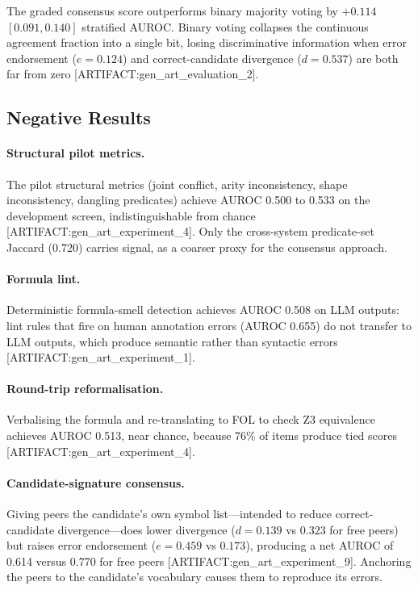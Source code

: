 \documentclass[11pt,letterpaper]{article}
\begin{document}
The graded consensus score outperforms binary majority voting by $+0.114$ $[0.091, 0.140]$ stratified AUROC.
Binary voting collapses the continuous agreement fraction into a single bit, losing discriminative information when error endorsement ($e = 0.124$) and correct-candidate divergence ($d = 0.537$) are both far from zero [ARTIFACT:gen\_art\_evaluation\_2].

\subsection{Negative Results}
\label{sec:negative}

\paragraph{Structural pilot metrics.}
The pilot structural metrics (joint conflict, arity inconsistency, shape inconsistency, dangling predicates) achieve AUROC 0.500 to 0.533 on the development screen, indistinguishable from chance [ARTIFACT:gen\_art\_experiment\_4].
Only the cross-system predicate-set Jaccard (0.720) carries signal, as a coarser proxy for the consensus approach.

\paragraph{Formula lint.}
Deterministic formula-smell detection achieves AUROC 0.508 on LLM outputs: lint rules that fire on human annotation errors (AUROC 0.655) do not transfer to LLM outputs, which produce semantic rather than syntactic errors [ARTIFACT:gen\_art\_experiment\_1].

\paragraph{Round-trip reformalisation.}
Verbalising the formula and re-translating to FOL to check Z3 equivalence achieves AUROC 0.513, near chance, because 76\% of items produce tied scores [ARTIFACT:gen\_art\_experiment\_4].

\paragraph{Candidate-signature consensus.}
Giving peers the candidate's own symbol list---intended to reduce correct-candidate divergence---does lower divergence ($d = 0.139$ vs $0.323$ for free peers) but raises error endorsement ($e = 0.459$ vs $0.173$), producing a net AUROC of 0.614 versus 0.770 for free peers [ARTIFACT:gen\_art\_experiment\_9].
Anchoring the peers to the candidate's vocabulary causes them to reproduce its errors.
\end{document}
